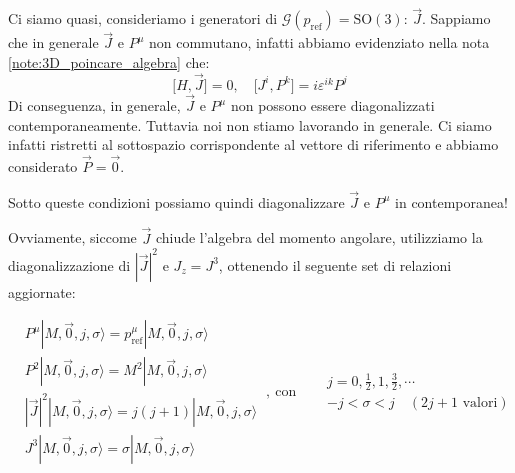 \documentclass[../main.tex]{subfiles}
\begin{document}
Ci siamo quasi, consideriamo i generatori di $\mathscr G(p_\text{ref}) = \text{SO}(3)$: $\Vec{J}$. Sappiamo che in generale $\Vec{J}$ e $P^\mu$ non commutano, infatti abbiamo evidenziato nella nota \ref{note:3D_poincare_algebra} che:
\[
 \big[ H, \Vec{J} \big] = 0, \quad \big[ J^{i}, P^{k} \big] = i\varepsilon^{ik}P^j
\]
Di conseguenza, in generale, $\Vec{J}$ e $P^\mu$ non possono essere diagonalizzati contemporaneamente. Tuttavia noi non stiamo lavorando in generale. Ci siamo infatti ristretti al sottospazio corrispondente al vettore di riferimento e abbiamo considerato $\Vec{P} = \Vec 0$.

Sotto queste condizioni possiamo quindi diagonalizzare $\Vec{J}$ e $P^\mu$ in contemporanea!

Ovviamente, siccome $\Vec{J}$ chiude l'algebra del momento angolare, utilizziamo la diagonalizzazione di \(|\Vec{J}|^2\) e \(J_z=J^3\), ottenendo il seguente set di relazioni aggiornate:

\[
\boxed{
    \begin{aligned}
        &P^\mu|M, \Vec{0}, j, \sigma\rangle = p^\mu_\text{ref}|M, \Vec{0}, j, \sigma\rangle\\
        &P^2|M, \Vec{0}, j, \sigma\rangle = M^2|M, \Vec{0}, j, \sigma\rangle\\
        &|\Vec{J}|^2|M, \Vec{0}, j, \sigma\rangle = j(j+1)|M, \Vec{0}, j, \sigma\rangle\\
        &J^3|M, \Vec{0}, j, \sigma\rangle = \sigma|M, \Vec{0}, j, \sigma\rangle
    \end{aligned}
}~,~ \text{con} \quad
\begin{aligned}
    &j=0,\frac{1}{2},1,\frac{3}{2},\cdots\\
    &-j<\sigma<j \quad (2j+1 \text{ valori})
\end{aligned}
\]
\end{document}

